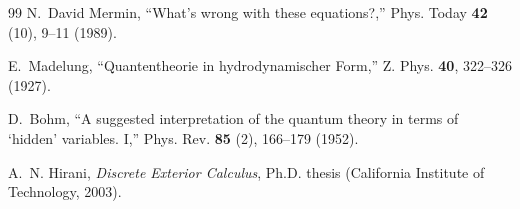 \documentclass[11pt,twocolumn]{article}
\begin{document}
\begin{thebibliography}{99}
 N.~David Mermin, ``What's wrong with these equations?,''
Phys. Today \textbf{42} (10), 9--11 (1989).

 E.~Madelung, ``Quantentheorie in hydrodynamischer Form,''
Z. Phys. \textbf{40}, 322--326 (1927).

 D.~Bohm, ``A suggested interpretation of the quantum theory in terms of `hidden' variables. I,''
Phys. Rev. \textbf{85} (2), 166--179 (1952).

 A.~N. Hirani, \textit{Discrete Exterior Calculus},
Ph.D. thesis (California Institute of Technology, 2003).

\end{thebibliography}
\end{document}
